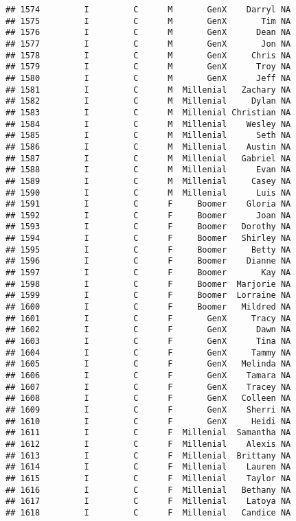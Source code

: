 \documentclass[
]{article}
\begin{document}
\begin{verbatim}
## 1574         I         C      M       GenX    Darryl NA
## 1575         I         C      M       GenX       Tim NA
## 1576         I         C      M       GenX      Dean NA
## 1577         I         C      M       GenX       Jon NA
## 1578         I         C      M       GenX     Chris NA
## 1579         I         C      M       GenX      Troy NA
## 1580         I         C      M       GenX      Jeff NA
## 1581         I         C      M  Millenial   Zachary NA
## 1582         I         C      M  Millenial     Dylan NA
## 1583         I         C      M  Millenial Christian NA
## 1584         I         C      M  Millenial    Wesley NA
## 1585         I         C      M  Millenial      Seth NA
## 1586         I         C      M  Millenial    Austin NA
## 1587         I         C      M  Millenial   Gabriel NA
## 1588         I         C      M  Millenial      Evan NA
## 1589         I         C      M  Millenial     Casey NA
## 1590         I         C      M  Millenial      Luis NA
## 1591         I         C      F     Boomer    Gloria NA
## 1592         I         C      F     Boomer      Joan NA
## 1593         I         C      F     Boomer   Dorothy NA
## 1594         I         C      F     Boomer   Shirley NA
## 1595         I         C      F     Boomer     Betty NA
## 1596         I         C      F     Boomer    Dianne NA
## 1597         I         C      F     Boomer       Kay NA
## 1598         I         C      F     Boomer  Marjorie NA
## 1599         I         C      F     Boomer  Lorraine NA
## 1600         I         C      F     Boomer   Mildred NA
## 1601         I         C      F       GenX     Tracy NA
## 1602         I         C      F       GenX      Dawn NA
## 1603         I         C      F       GenX      Tina NA
## 1604         I         C      F       GenX     Tammy NA
## 1605         I         C      F       GenX   Melinda NA
## 1606         I         C      F       GenX    Tamara NA
## 1607         I         C      F       GenX    Tracey NA
## 1608         I         C      F       GenX   Colleen NA
## 1609         I         C      F       GenX    Sherri NA
## 1610         I         C      F       GenX     Heidi NA
## 1611         I         C      F  Millenial  Samantha NA
## 1612         I         C      F  Millenial    Alexis NA
## 1613         I         C      F  Millenial  Brittany NA
## 1614         I         C      F  Millenial    Lauren NA
## 1615         I         C      F  Millenial    Taylor NA
## 1616         I         C      F  Millenial   Bethany NA
## 1617         I         C      F  Millenial    Latoya NA
## 1618         I         C      F  Millenial   Candice NA

\end{verbatim}
\end{document}
